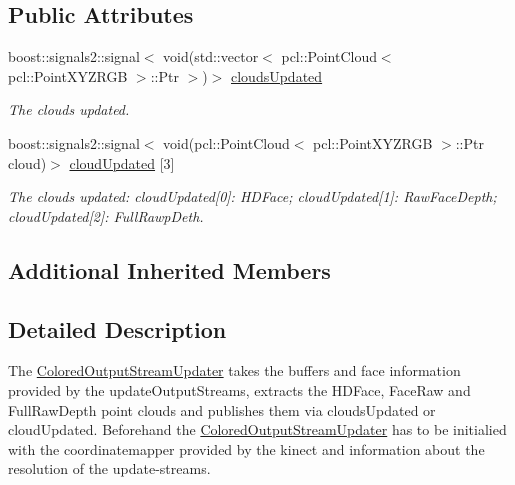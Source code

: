 \subsection*{Public Attributes}
\begin{DoxyCompactItemize}
\item 
\hypertarget{class_colored_output_stream_updater_a1cb42a8167b9d0fde679c6e5f1b39708}{}boost\+::signals2\+::signal$<$ void(std\+::vector$<$ pcl\+::\+Point\+Cloud$<$ pcl\+::\+Point\+X\+Y\+Z\+R\+G\+B $>$\+::Ptr $>$)$>$ \hyperlink{class_colored_output_stream_updater_a1cb42a8167b9d0fde679c6e5f1b39708}{clouds\+Updated}\label{class_colored_output_stream_updater_a1cb42a8167b9d0fde679c6e5f1b39708}

\begin{DoxyCompactList}\small\item\em The clouds updated. \end{DoxyCompactList}\item 
\hypertarget{class_colored_output_stream_updater_ae425a2f5caef2adbf5dff436935446d7}{}boost\+::signals2\+::signal$<$ void(pcl\+::\+Point\+Cloud$<$ pcl\+::\+Point\+X\+Y\+Z\+R\+G\+B $>$\+::Ptr cloud)$>$ \hyperlink{class_colored_output_stream_updater_ae425a2f5caef2adbf5dff436935446d7}{cloud\+Updated} \mbox{[}3\mbox{]}\label{class_colored_output_stream_updater_ae425a2f5caef2adbf5dff436935446d7}

\begin{DoxyCompactList}\small\item\em The clouds updated\+: cloud\+Updated\mbox{[}0\mbox{]}\+: H\+D\+Face; cloud\+Updated\mbox{[}1\mbox{]}\+: Raw\+Face\+Depth; cloud\+Updated\mbox{[}2\mbox{]}\+: Full\+Rawp\+Deth. \end{DoxyCompactList}\end{DoxyCompactItemize}
\subsection*{Additional Inherited Members}


\subsection{Detailed Description}
The \hyperlink{class_colored_output_stream_updater}{Colored\+Output\+Stream\+Updater} takes the buffers and face information provided by the update\+Output\+Streams, extracts the H\+D\+Face, Face\+Raw and Full\+Raw\+Depth point clouds and publishes them via clouds\+Updated or cloud\+Updated. Beforehand the \hyperlink{class_colored_output_stream_updater}{Colored\+Output\+Stream\+Updater} has to be initialied with the coordinatemapper provided by the kinect and information about the resolution of the update-\/streams. 

